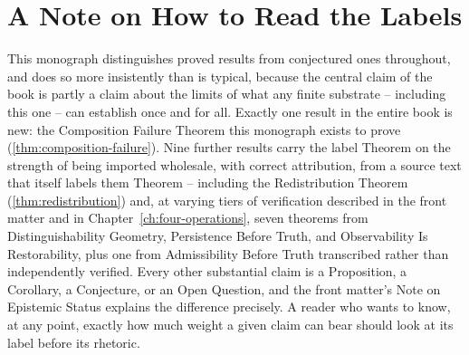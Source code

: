\section{A Note on How to Read the Labels}

This monograph distinguishes proved results from conjectured ones
throughout, and does so more insistently than is typical, because the
central claim of the book is partly a claim about the limits of what any
finite substrate -- including this one -- can establish once and for
all. Exactly one result in the entire book is new: the Composition
Failure Theorem this monograph exists to prove
(\cref{thm:composition-failure}). Nine further results carry the label
Theorem on the strength of being imported wholesale, with correct
attribution, from a source text that itself labels them Theorem --
including the Redistribution Theorem
(\cref{thm:redistribution}) and, at varying tiers of verification
described in the front matter and in Chapter~\ref{ch:four-operations},
seven theorems from Distinguishability Geometry, Persistence Before
Truth, and Observability Is Restorability, plus one from Admissibility
Before Truth transcribed rather than independently verified. Every other
substantial claim is a Proposition, a Corollary, a Conjecture, or an
Open Question, and the front matter's Note on Epistemic Status explains
the difference precisely. A reader who wants to know, at any point,
exactly how much weight a given claim can bear should look at its label
before its rhetoric.
